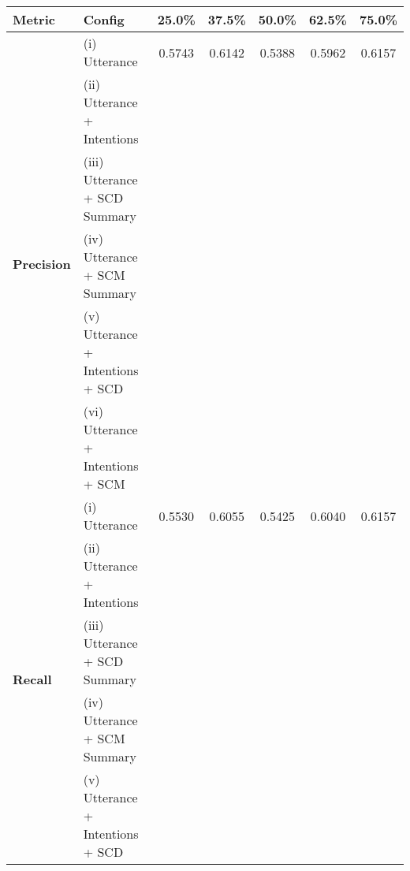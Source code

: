 \begin{table*}[ht]
\centering
\begin{tabular}{llccccc}
\hline
\textbf{Metric} & \textbf{Config} & \textbf{25.0\%} & \textbf{37.5\%} & \textbf{50.0\%} & \textbf{62.5\%} & \textbf{75.0\%} \\
\hline
\multirow{6}{*}{\textbf{Precision}} & (i) Utterance & 0.5743 & 0.6142 & 0.5388 & 0.5962 & 0.6157 \\
 & (ii) Utterance + Intentions & \cellcolor{green!25}{0.6271} & \cellcolor{green!25}{0.6149} & \cellcolor{red!25}{0.5011} & \cellcolor{red!25}{0.5671} & \cellcolor{red!25}{0.5994} \\
 & (iii) Utterance + SCD Summary & \cellcolor{green!25}{0.6009} & \cellcolor{red!25}{0.6043} & \cellcolor{green!25}{0.5499} & \cellcolor{red!25}{0.5822} & \cellcolor{red!25}{0.6005} \\
 & (iv) Utterance + SCM Summary & \cellcolor{green!25}{0.5781} & \cellcolor{red!25}{0.5887} & \cellcolor{green!25}{0.5463} & \cellcolor{red!25}{0.5806} & \cellcolor{red!25}{0.6097} \\
 & (v) Utterance + Intentions + SCD & \cellcolor{green!25}{0.6211} & \cellcolor{red!25}{0.5971} & \cellcolor{green!25}{0.5430} & \cellcolor{green!25}{0.6117} & \cellcolor{green!25}{0.6167} \\
 & (vi) Utterance + Intentions + SCM & \cellcolor{green!25}{0.5747} & \cellcolor{red!25}{0.5695} & \cellcolor{red!25}{0.5328} & \cellcolor{red!25}{0.5729} & \cellcolor{green!25}{0.6285} \\
\midrule
\multirow{6}{*}{\textbf{Recall}} & (i) Utterance & 0.5530 & 0.6055 & 0.5425 & 0.6040 & 0.6157 \\
 & (ii) Utterance + Intentions & \cellcolor{green!25}{0.6037} & \cellcolor{green!25}{0.6177} & \cellcolor{red!25}{0.5012} & \cellcolor{red!25}{0.5702} & \cellcolor{red!25}{0.5927} \\
 & (iii) Utterance + SCD Summary & \cellcolor{green!25}{0.5914} & \cellcolor{green!25}{0.6069} & \cellcolor{green!25}{0.5547} & \cellcolor{red!25}{0.5838} & \cellcolor{red!25}{0.5969} \\
 & (iv) Utterance + SCM Summary & \cellcolor{green!25}{0.5670} & \cellcolor{red!25}{0.5947} & \cellcolor{green!25}{0.5505} & \cellcolor{red!25}{0.5847} & \cellcolor{red!25}{0.6082} \\
 & (v) Utterance + Intentions + SCD & \cellcolor{green!25}{0.6247} & \cellcolor{green!25}{0.6069} & \cellcolor{green!25}{0.5448} & \cellcolor{green!25}{0.6077} & \cellcolor{red!25}{0.6067} \\

\end{tabular}
\end{table*}
